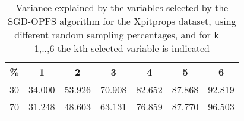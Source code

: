 \begin{table}
	\begin{center}
		\begin{tabular}{c c c c c c c}
			\% & 1 & 2 & 3 & 4 & 5 & 6 \\
			\hline
			30 & 34.000 & 53.926 & 70.908 & 82.652 & 87.868 & 92.819 \\
			70 & 31.248 & 48.603 & 63.131 & 76.859 & 87.770 & 96.503 \\
		\end{tabular}
	\end{center}
	\caption{Variance explained by the variables selected by the SGD-OPFS algorithm for the Xpitprops dataset, using different random sampling percentages, and for k = 1,..,6 the kth selected variable is indicated}
\end{table}